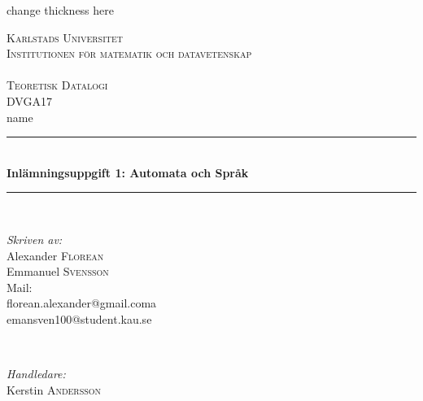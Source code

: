 \begin{titlepage}

\newcommand{\HRule}{\rule{\linewidth}{0.5mm}} %
change thickness here

\center %
 

 \textsc{\LARGE{Karlstads Universitet}\\ \small Institutionen för matematik och datavetenskap}\\
 \textsc{\Large \\Teoretisk Datalogi \\ \small DVGA17}\\ %
 name



 \HRule \\[0.3cm]
 { \huge \bfseries Inlämningsuppgift 1: Automata och Språk}\\[0.3cm] %
 \HRule \\[1.5cm]
  

  \begin{minipage}{0.4\textwidth}
  \begin{flushleft} \large
  \emph{Skriven av:}\\
  Alexander \textsc{Florean}\\
  Emmanuel \textsc{Svensson}\\
  Mail: \\
  florean.alexander@gmail.coma\\
  emansven100@student.kau.se
  \end{flushleft}
  \end{minipage}
  ~
  \begin{minipage}{0.4\textwidth}
  \begin{flushright} \large
  \emph{Handledare:}\\
  Kerstin \textsc{Andersson}
  

\end{flushright}
\end{minipage}
\end{titlepage}
